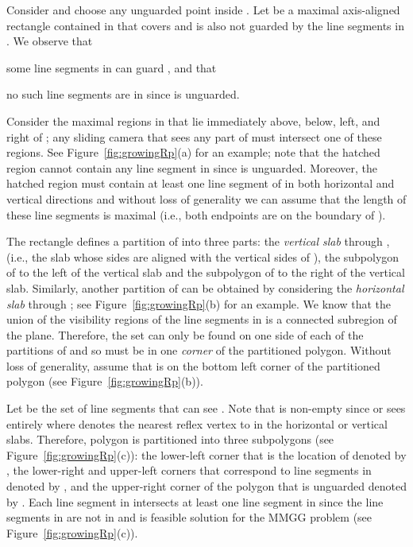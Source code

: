 \documentclass{llncs}
\begin{document}
Consider  and choose any unguarded point  inside . Let  be a maximal axis-aligned
rectangle contained in  that
covers  and is also not guarded by the line segments in . We observe that \begin{inparaenum}[(i)]\item some line segments
in  can guard ,
and that \item no such line segments are in  since  is unguarded. \end{inparaenum} 
Consider the maximal regions in  that lie immediately above, below, left, and right of ;
any sliding camera that sees any part of  must intersect one of these regions.
See Figure~\ref{fig:growingRp}(a) for an example; note that the hatched region
cannot contain any line segment in  since  is unguarded. Moreover, the hatched region must contain at least one line segment
of  in both horizontal and vertical directions and without loss of generality we can assume that the length of these
line segments is maximal (i.e., both endpoints are on the boundary of ).

The rectangle  defines a partition of  into three parts: the \emph{vertical slab} through , (i.e., the slab
whose sides are aligned with the vertical sides of ), the subpolygon of  to the left of the vertical slab and the subpolygon of  to the
right of the vertical slab. Similarly, another partition of  can be obtained by considering the \emph{horizontal slab} through ; see
Figure~\ref{fig:growingRp}(b) for an example. We know that the union of the visibility regions of the line segments in  is a
connected subregion of the plane. Therefore, the set  can only be found on one side of each of the partitions of  and so  must be
in one \emph{corner} of the partitioned polygon. Without loss of generality, assume that  is on the bottom left corner of the partitioned polygon
(see Figure~\ref{fig:growingRp}(b)).

Let  be the set of line segments that can see . Note that 
is non-empty since  or  sees  entirely where  denotes the nearest reflex vertex to  in the horizontal or vertical slabs. Therefore, polygon  is partitioned into three subpolygons (see Figure~\ref{fig:growingRp}(c)): the lower-left corner that is the location of  denoted by , the lower-right and upper-left corners that correspond to line segments in  denoted by , and the upper-right corner of the polygon that is unguarded denoted by .
Each line segment in  intersects at least one line segment in 
since the line segments in  are not in  and  is feasible solution for the MMGG problem (see Figure~\ref{fig:growingRp}(c)).
\end{document}
